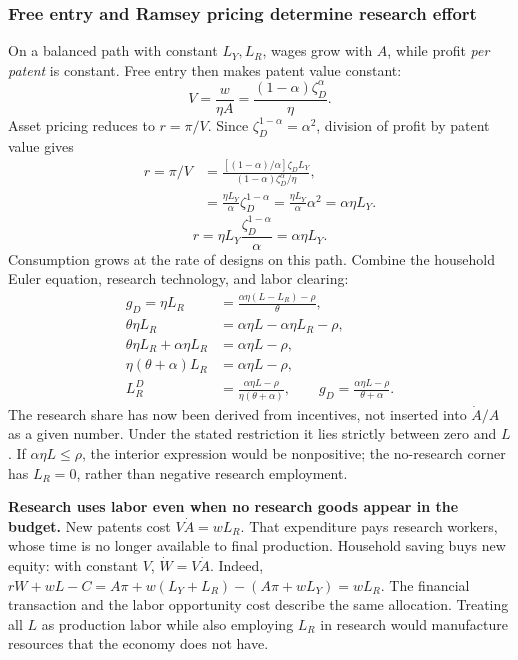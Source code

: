 \subsubsection{Free entry and Ramsey pricing determine research effort}

On a balanced path with constant $L_Y,L_R$, wages grow with $A$, while profit
\emph{per patent} is constant. Free entry then makes patent value constant:
\begin{equation}
V=\frac{w}{\eta A}
=\frac{(1-\alpha)\zeta_D^\alpha}{\eta}.
\end{equation}
Asset pricing reduces to $r=\pi/V$. Since
$\zeta_D^{1-\alpha}=\alpha^2$,
division of profit by patent value gives
\begin{align}
r=\pi/V
 &=\frac{[(1-\alpha)/\alpha]\zeta_D L_Y}
         {(1-\alpha)\zeta_D^\alpha/\eta},\\
 &=\frac{\eta L_Y}{\alpha}\zeta_D^{1-\alpha}
  =\frac{\eta L_Y}{\alpha}\alpha^2
  =\alpha\eta L_Y.
\end{align}
\begin{equation}\label{eq:eg-idea-return}
r=\eta L_Y\frac{\zeta_D^{1-\alpha}}{\alpha}
=\alpha\eta L_Y.
\end{equation}
Consumption grows at the rate of designs on this path. Combine the household
Euler equation, research technology, and labor clearing:
\begin{align}
g_D=\eta L_R&=\frac{\alpha\eta(L-L_R)-\rho}{\theta},\\
\theta\eta L_R&=\alpha\eta L-\alpha\eta L_R-\rho,\\
\theta\eta L_R+\alpha\eta L_R&=\alpha\eta L-\rho,\\
\eta(\theta+\alpha)L_R&=\alpha\eta L-\rho,\\
L_R^D&=\frac{\alpha\eta L-\rho}{\eta(\theta+\alpha)},\qquad
 g_D=\frac{\alpha\eta L-\rho}{\theta+\alpha}.
\label{eq:eg-idea-growth}
\end{align}
The research share has now been derived from incentives, not inserted into
$\dot A/A$ as a given number. Under the stated restriction it lies strictly
between zero and $L$. If $\alpha\eta L\leq\rho$, the interior expression
would be nonpositive; the no-research corner has $L_R=0$, rather than negative
research employment.

\begin{blueblock}
\textbf{Research uses labor even when no research goods appear in the budget.}
New patents cost $V\dot A=wL_R$. That expenditure pays research workers,
whose time is no longer available to final production. Household saving buys
new equity: with constant $V$, $\dot W=V\dot A$. Indeed,
$rW+wL-C=A\pi+w(L_Y+L_R)-(A\pi+wL_Y)=wL_R$.
The financial transaction and the labor opportunity cost describe the same
allocation. Treating all $L$ as production labor while also employing $L_R$
in research would manufacture resources that the economy does not have.
\end{blueblock}

